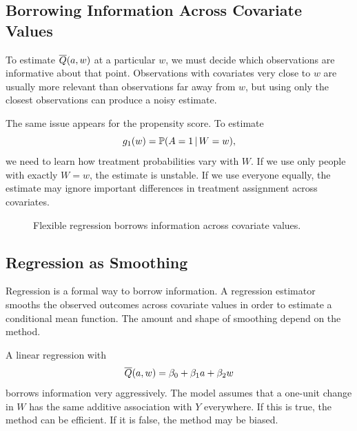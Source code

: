 \subsection{Borrowing Information Across Covariate Values}

To estimate $\overline{Q}(a,w)$ at a particular $w$, we must decide which observations are
informative about that point. Observations with covariates very close to $w$ are
usually more relevant than observations far away from $w$, but using only the closest
observations can produce a noisy estimate.

The same issue appears for the propensity score. To estimate
\[
g_1(w)=\mathbb{P}(A=1\,\vert\, W=w),
\]
we need to learn how treatment probabilities vary with $W$. If we use only people
with exactly $W=w$, the estimate is unstable. If we use everyone equally, the estimate
may ignore important differences in treatment assignment across covariates.

\begin{figure}[H]
\centering
{}
\caption{Flexible regression borrows information across covariate values.}
\label{fig:ch5-borrowing}
\end{figure}

\subsection{Regression as Smoothing}

Regression is a formal way to borrow information. A regression estimator smooths the
observed outcomes across covariate values in order to estimate a conditional mean
function. The amount and shape of smoothing depend on the method.

A linear regression with
\[
\overline{Q}(a,w)=\beta_0+\beta_1a+\beta_2w
\]
borrows information very aggressively. The model assumes that a one-unit change in
$W$ has the same additive association with $Y$ everywhere. If this is true, the method
can be efficient. If it is false, the method may be biased.

